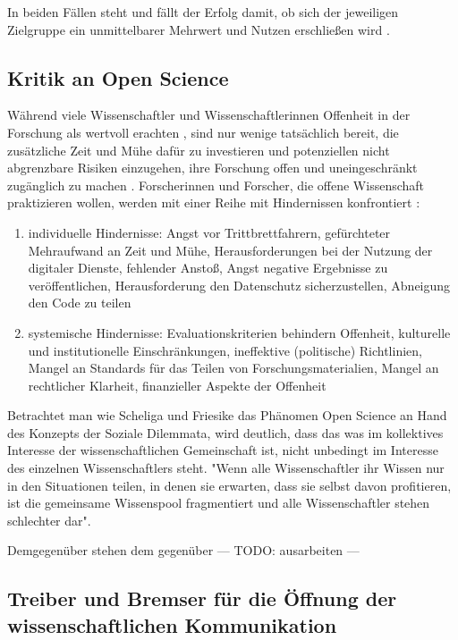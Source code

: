In beiden Fällen steht und fällt der Erfolg damit, ob sich der jeweiligen Zielgruppe ein unmittelbarer Mehrwert und Nutzen erschließen wird \cite{schulze_2013_open}.

\subsection{Kritik an Open Science}

Während viele Wissenschaftler und Wissenschaftlerinnen Offenheit in der Forschung als wertvoll erachten \cite{suchen}, sind nur wenige tatsächlich bereit, die zusätzliche Zeit und Mühe dafür zu investieren und potenziellen nicht abgrenzbare Risiken einzugehen, ihre Forschung offen und uneingeschränkt zugänglich zu machen \cite{Scheliga_2014} \cite{Procter_2010}. Forscherinnen und Forscher, die offene Wissenschaft praktizieren wollen, werden mit einer Reihe mit Hindernissen konfrontiert \cite{Scheliga_2014}: 
\begin{enumerate}
\item individuelle Hindernisse: Angst vor Trittbrettfahrern, gefürchteter Mehraufwand an Zeit und Mühe, Herausforderungen bei der Nutzung der digitaler Dienste, fehlender Anstoß, Angst negative Ergebnisse zu veröffentlichen, Herausforderung den Datenschutz sicherzustellen, Abneigung den Code zu teilen
\item systemische Hindernisse: Evaluationskriterien behindern Offenheit, kulturelle und institutionelle Einschränkungen, ineffektive (politische) Richtlinien, Mangel an Standards für das Teilen von Forschungsmaterialien, Mangel an rechtlicher Klarheit, finanzieller Aspekte der Offenheit
\end{enumerate}

Betrachtet man wie Scheliga und Friesike das Phänomen Open Science an Hand des Konzepts der Soziale Dilemmata, wird deutlich, dass das was im kollektives Interesse der wissenschaftlichen Gemeinschaft ist, nicht unbedingt im Interesse des einzelnen Wissenschaftlers steht. "Wenn alle Wissenschaftler ihr Wissen nur in den Situationen teilen, in denen sie erwarten, dass sie selbst davon profitieren, ist die gemeinsame Wissenspool fragmentiert und alle Wissenschaftler stehen schlechter dar"\cite{Scheliga_2014}. 

Demgegenüber stehen dem gegenüber  --- TODO: ausarbeiten ---

\subsection{Treiber und Bremser für die Öffnung der wissenschaftlichen Kommunikation}

